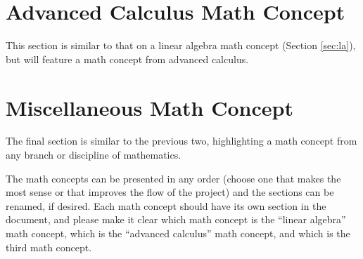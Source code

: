 \documentclass[final]{siamart1116}
\begin{document}
\section{Advanced Calculus Math Concept}
\label{sec:ac}
This section is similar to that on a linear algebra math concept (Section \ref{sec:la}), but will feature a math concept from advanced calculus.

\section{Miscellaneous Math Concept}
\label{sec:misc}
The final section is similar to the previous two, highlighting a math concept from any branch or discipline of mathematics.

The math concepts can be presented in any order (choose one that makes the most sense or that improves the flow of the project) and the sections can be renamed, if desired. Each math concept should have its own section in the document, and please make it clear which math concept is the ``linear algebra'' math concept, which is the ``advanced calculus'' math concept, and which is the third math concept.



\end{document}
